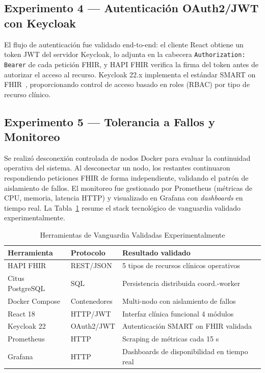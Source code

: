 \documentclass[conference]{IEEEtran}
\begin{document}
\subsection{Experimento 4 --- Autenticaci\'on OAuth2/JWT con Keycloak}

El flujo de autenticaci\'on fue validado end-to-end: el cliente React
obtiene un token JWT del servidor Keycloak, lo adjunta en la cabecera
\texttt{Authorization: Bearer} de cada petici\'on FHIR, y HAPI FHIR
verifica la firma del token antes de autorizar el acceso al recurso.
Keycloak 22.x implementa el est\'andar SMART on FHIR~\cite{bsmart},
proporcionando control de acceso basado en roles (RBAC) por tipo de
recurso cl\'inico.

\subsection{Experimento 5 --- Tolerancia a Fallos y Monitoreo}

Se realiz\'o desconexi\'on controlada de nodos Docker para evaluar la
continuidad operativa del sistema. Al desconectar un nodo, los
restantes continuaron respondiendo peticiones FHIR de forma
independiente, validando el patr\'on de aislamiento de fallos. El
monitoreo fue gestionado por Prometheus (m\'etricas de CPU, memoria,
latencia HTTP) y visualizado en Grafana con \textit{dashboards} en
tiempo real. La Tabla~\ref{tab:herramientas} resume el stack tecnol\'ogico
de vanguardia validado experimentalmente.

\begin{table}[htbp]
\caption{Herramientas de Vanguardia Validadas Experimentalmente}
\label{tab:herramientas}
\begin{center}
\renewcommand{\arraystretch}{1.2}
\begin{tabular}{|p{2.0cm}|p{1.7cm}|p{3.5cm}|}
\hline
\textbf{Herramienta} & \textbf{Protocolo} & \textbf{Resultado validado} \\
\hline
HAPI FHIR & REST/JSON & 5 tipos de recursos cl\'inicos operativos \\
\hline
Citus PostgreSQL & SQL & Persistencia distribuida coord.-worker \\
\hline
Docker Compose & Contenedores & Multi-nodo con aislamiento de fallos \\
\hline
React 18 & HTTP/JWT & Interfaz cl\'inica funcional 4 m\'odulos \\
\hline
Keycloak 22 & OAuth2/JWT & Autenticaci\'on SMART on FHIR validada \\
\hline
Prometheus & HTTP & Scraping de m\'etricas cada 15 s \\
\hline
Grafana & HTTP & Dashboards de disponibilidad en tiempo real \\
\hline
\end{tabular}
\end{center}
\end{table}
\end{document}
